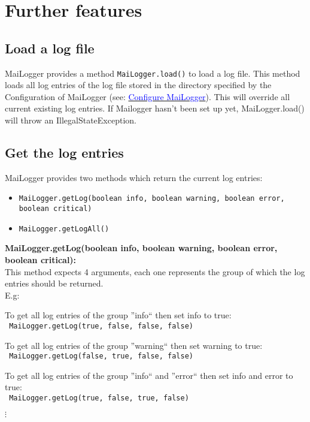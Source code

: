 \documentclass{article}
\newcommand{\refh}[2]{\hyperref[#1] {\textcolor{blue}{#2}}}
\newcommand{\tab}[1][1]{\hspace*{#1cm}}
\begin{document}
\section{Further features}
    \subsection{Load a log file}
    MaiLogger provides a method \lstinline|MaiLogger.load()| to load a log file.
    This method loads all log entries of the log file stored in the directory specified by the Configuration of MaiLogger (see: \refh{setup_mailogger.setup}{Configure MaiLogger}).
    This will override all current existing log entries.
    If Mailogger hasn't been set up yet, MaiLogger.load() will throw an IllegalStateException.

    \subsection{Get the log entries}
    MaiLogger provides two methods which return the current log entries:
    \begin{itemize}
        \item \lstinline|MaiLogger.getLog(boolean info, boolean warning, boolean error, boolean critical)|
        \item \lstinline|MaiLogger.getLogAll()|
    \end{itemize}

    \textbf{MaiLogger.getLog(boolean info, boolean warning, boolean error, boolean critical):} \\
    This method expects 4 arguments, each one represents the group of which the log entries should be returned. \\
    E.g: \\
    \begin{description}
        \item To get all log entries of the group ''info`` then set info to true: \\ \lstinline| MaiLogger.getLog(true, false, false, false)|
        \item To get all log entries of the group ''warning`` then set warning to true: \\ \lstinline| MaiLogger.getLog(false, true, false, false)|
        \item To get all log entries of the group ''info`` and ''error`` then set info and error to true: \\ \lstinline| MaiLogger.getLog(true, false, true, false)|
        \item \tab[5] $\vdots$
    \end{description}
\end{document}
